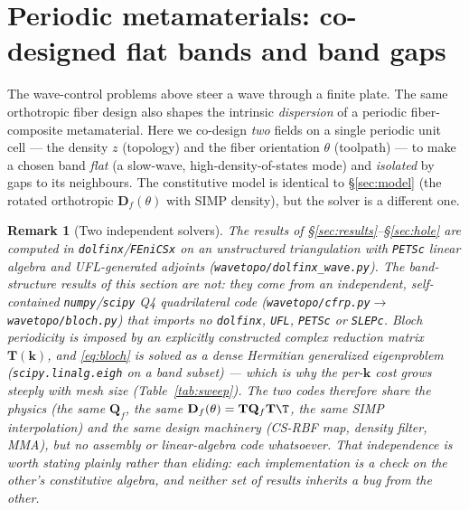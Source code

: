 \documentclass[11pt]{article}
\newtheorem{remark}{Remark}
\begin{document}
\section{Periodic metamaterials: co-designed flat bands and band gaps}
\label{sec:meta}
The wave-control problems above steer a wave through a finite plate. The same
orthotropic fiber design also shapes the intrinsic \emph{dispersion} of a periodic
fiber-composite metamaterial. Here we co-design \emph{two} fields on a single
periodic unit cell --- the density $z$ (topology) and the fiber orientation
$\theta$ (toolpath) --- to make a chosen band \emph{flat} (a slow-wave,
high-density-of-states mode) and \emph{isolated} by gaps to its neighbours. The
constitutive model is identical to \S\ref{sec:model} (the rotated orthotropic
$\mathbf D_f(\theta)$ with SIMP density), but the solver is a different one.

\begin{remark}[Two independent solvers]
\label{rem:solvers}
The results of \S\ref{sec:results}--\S\ref{sec:hole} are computed in
\texttt{dolfinx}/\texttt{FEniCSx} on an unstructured triangulation with
\texttt{PETSc} linear algebra and UFL-generated adjoints
(\texttt{wavetopo/dolfinx\_wave.py}). The band-structure results of this section are
\emph{not}: they come from an independent, self-contained
\texttt{numpy}/\texttt{scipy} Q4 quadrilateral code
(\texttt{wavetopo/cfrp.py}$\rightarrow$\texttt{wavetopo/bloch.py}) that imports no
\texttt{dolfinx}, \texttt{UFL}, \texttt{PETSc} or \texttt{SLEPc}. Bloch
periodicity is imposed by an explicitly constructed complex reduction matrix
$\mathbf T(\mathbf k)$, and \eqref{eq:bloch} is solved as a \emph{dense} Hermitian
generalized eigenproblem (\texttt{scipy.linalg.eigh} on a band subset) --- which is
why the per-$\mathbf k$ cost grows steeply with mesh size
(Table~\ref{tab:sweep}). The two codes therefore share the \emph{physics} (the same
$\mathbf Q_f$, the same $\mathbf D_f(\theta)=\mathbf T\mathbf Q_f\mathbf T\T$, the
same SIMP interpolation) and the same design machinery (CS-RBF map, density
filter, MMA), but no assembly or linear-algebra code whatsoever. That independence
is worth stating plainly rather than eliding: each implementation is a check on the
other's constitutive algebra, and neither set of results inherits a bug from the
other.
\end{remark}
\end{document}
